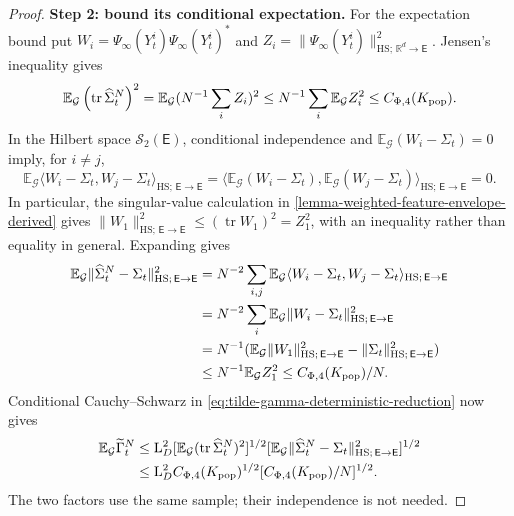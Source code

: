 \begin{proof}
\par\noindent\textbf{Step 2: bound its conditional expectation.}
For the expectation bound put
$W_i=\Psi_\infty(Y_t^i)\Psi_\infty(Y_t^i)^*$ and
$Z_i=\|\Psi_\infty(Y_t^i)\|_{\mathrm{HS};\,\mathbb R^d\to\mathsf E}^2$. Jensen's inequality gives
\[
 \mathbb E_{\mathcal G}\left(\operatorname{tr}\widehat\Sigma_t^N\right)^2
 =\mathbb E_{\mathcal G}(N^{-1}\sum_iZ_i)^2
 \le N^{-1}\sum_i\mathbb E_{\mathcal G}Z_i^2
 \le C_{\Phi,4}(K_{\rm pop}).
\]
In the Hilbert space $\mathcal S_2(\mathsf E)$, conditional independence
and $\mathbb E_{\mathcal G}(W_i-\Sigma_t)=0$ imply, for $i\ne j$,
\[
 \mathbb E_{\mathcal G}\langle W_i-\Sigma_t,W_j-\Sigma_t\rangle_{\mathrm{HS};\,\mathsf E\to\mathsf E}
 =\langle\mathbb E_{\mathcal G}(W_i-\Sigma_t),
          \mathbb E_{\mathcal G}(W_j-\Sigma_t)\rangle_{\mathrm{HS};\,\mathsf E\to\mathsf E}=0.
\]
In particular, the singular-value calculation in
\cref{lemma-weighted-feature-envelope-derived} gives
$\|W_1\|_{\mathrm{HS};\,\mathsf E\to\mathsf E}^2\le(\operatorname{tr}W_1)^2=Z_1^2$,
with an inequality rather than equality in general. Expanding gives
\begin{equation}
\label{eq:weighted-covariance-mean-square}
\begin{aligned}
 \mathbb E_{\mathcal G}\|\widehat\Sigma_t^N-\Sigma_t\|_{\mathrm{HS};\,\mathsf E\to\mathsf E}^2
 &=N^{-2}\sum_{i,j}\mathbb E_{\mathcal G}
        \langle W_i-\Sigma_t,W_j-\Sigma_t\rangle_{\mathrm{HS};\,\mathsf E\to\mathsf E}\\
 &=N^{-2}\sum_i\mathbb E_{\mathcal G}\|W_i-\Sigma_t\|_{\mathrm{HS};\,\mathsf E\to\mathsf E}^2\\
 &=N^{-1}(\mathbb E_{\mathcal G}\|W_1\|_{\mathrm{HS};\,\mathsf E\to\mathsf E}^2-\|\Sigma_t\|_{\mathrm{HS};\,\mathsf E\to\mathsf E}^2)\\
 &\le N^{-1}\mathbb E_{\mathcal G}Z_1^2
 \le C_{\Phi,4}(K_{\rm pop})/N.
\end{aligned}
\end{equation}
Conditional Cauchy--Schwarz in \eqref{eq:tilde-gamma-deterministic-reduction}
now gives
\[
\begin{aligned}
 \mathbb E_{\mathcal G}\widetilde\Gamma_t^N
 &\le\mathrm L_D^2
 [\mathbb E_{\mathcal G}(\operatorname{tr}\widehat\Sigma_t^N)^2]^{1/2}
 [\mathbb E_{\mathcal G}\|\widehat\Sigma_t^N-\Sigma_t\|_{\mathrm{HS};\,\mathsf E\to\mathsf E}^2]^{1/2}\\
 &\le\mathrm L_D^2 C_{\Phi,4}(K_{\rm pop})^{1/2}
          [C_{\Phi,4}(K_{\rm pop})/N]^{1/2}.
\end{aligned}
\]
The two factors use the same sample; their independence is not needed.
\end{proof}

